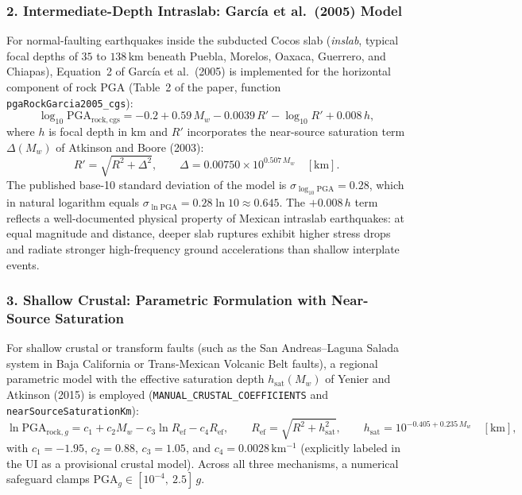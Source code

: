 \documentclass[11pt,a4paper]{article}
\newcommand{\unit}[1]{\mathrm{#1}}
\begin{document}
\subsubsection*{2. Intermediate-Depth Intraslab: Garc\'ia et al.\ (2005) Model}
For normal-faulting earthquakes inside the subducted Cocos slab (\emph{inslab}, typical focal depths of $35$ to
$138\,\unit{km}$ beneath Puebla, Morelos, Oaxaca, Guerrero, and Chiapas), Equation~2 of Garc\'ia et al.\ (2005)
is implemented for the horizontal component of rock $\mathrm{PGA}$ (Table~2 of the paper, function
\texttt{pgaRockGarcia2005\_cgs}):
\begin{equation}
  \log_{10}\mathrm{PGA}_{\mathrm{rock,cgs}}
  = -0.2 + 0.59\,M_w - 0.0039\,R' - \log_{10} R' + 0.008\,h,
  \label{eq:gmpe-garcia}
\end{equation}
where $h$ is focal depth in $\unit{km}$ and $R'$ incorporates the near-source saturation term $\Delta(M_w)$ of
Atkinson and Boore (2003):
\begin{equation}
  R' = \sqrt{R^2 + \Delta^2},
  \qquad
  \Delta = 0.00750\times 10^{0.507\,M_w}\quad[\unit{km}].
  \label{eq:saturacion-garcia}
\end{equation}
The published base-10 standard deviation of the model is $\sigma_{\log_{10}\mathrm{PGA}} = 0.28$, which in
natural logarithm equals $\sigma_{\ln\mathrm{PGA}} = 0.28\ln 10 \approx 0.645$. The $+0.008\,h$ term reflects a
well-documented physical property of Mexican intraslab earthquakes: at equal magnitude and distance, deeper slab
ruptures exhibit higher stress drops and radiate stronger high-frequency ground accelerations than shallow
interplate events.

\subsubsection*{3. Shallow Crustal: Parametric Formulation with Near-Source Saturation}
For shallow crustal or transform faults (such as the San Andreas--Laguna Salada system in Baja California or
Trans-Mexican Volcanic Belt faults), a regional parametric model with the effective saturation depth
$h_{\mathrm{sat}}(M_w)$ of Yenier and Atkinson (2015) is employed (\texttt{MANUAL\_CRUSTAL\_COEFFICIENTS} and
\texttt{nearSourceSaturationKm}):
\begin{equation}
  \ln\mathrm{PGA}_{\mathrm{rock},g}
  = c_1 + c_2 M_w - c_3\ln R_{\mathrm{ef}} - c_4 R_{\mathrm{ef}},
  \qquad
  R_{\mathrm{ef}} = \sqrt{R^2 + h_{\mathrm{sat}}^2},
  \qquad
  h_{\mathrm{sat}} = 10^{-0.405 + 0.235\,M_w}\quad[\unit{km}],
  \label{eq:gmpe-cortical}
\end{equation}
with $c_1 = -1.95$, $c_2 = 0.88$, $c_3 = 1.05$, and $c_4 = 0.0028\,\unit{km^{-1}}$ (explicitly labeled in the UI
as a provisional crustal model). Across all three mechanisms, a numerical safeguard clamps
$\mathrm{PGA}_g \in [10^{-4},\ 2.5]\,g$.
\end{document}
